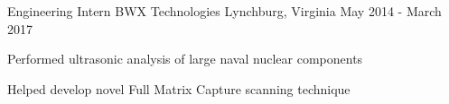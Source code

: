 \begin{cventries}
  \cventry
    {Engineering Intern} %
    {BWX Technologies} %
    {Lynchburg, Virginia} %
    {May 2014 - March 2017} %
    {
      \begin{cvitems} %
      \item  {Performed ultrasonic analysis of large naval nuclear components}
      \item  {Helped develop novel Full Matrix Capture scanning technique}
      \end{cvitems}
    }

\end{cventries}

